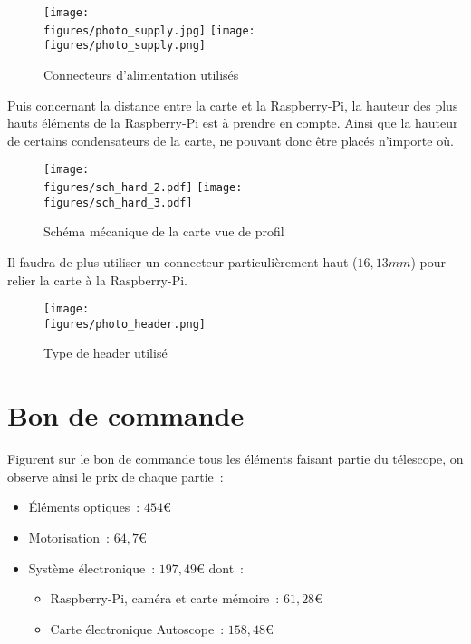 \begin{figure}[H]
    \centering
    \texttt{[image: \\figures/photo\_supply.jpg]}
	\hspace{1cm}
    \texttt{[image: \\figures/photo\_supply.png]}
    \decoRule
    \caption[
    Connecteurs d'alimentation utilisés]{
    Connecteurs d'alimentation utilisés}
    \label{fig:Connecteurs d'alimentation utilisés}
    \end{figure}

\vspace{1cm}

Puis concernant la distance entre la carte et la Raspberry-Pi, la hauteur des plus hauts éléments de la Raspberry-Pi est à prendre en compte. Ainsi que la hauteur de certains condensateurs de la carte, ne pouvant donc être placés n'importe où.

\begin{figure}[H]
    \centering
    \texttt{[image: \\figures/sch\_hard\_2.pdf]}
    \texttt{[image: \\figures/sch\_hard\_3.pdf]}
    \decoRule
    \caption[
    Schéma mécanique de la carte vue de profil]{
    Schéma mécanique de la carte vue de profil}
    \label{fig:Schéma mécanique de la carte vue de profil}
    \end{figure}

\vspace{1cm}

Il faudra de plus utiliser un connecteur particulièrement haut ($16,13mm$) pour relier la carte à la Raspberry-Pi.

\begin{figure}[H]
    \centering
    \texttt{[image: \\figures/photo\_header.png]}
    \decoRule
    \caption[
    Type de header utilisé]{
    Type de header utilisé}
    \label{fig:Type de header utilisé}
    \end{figure}

\newpage
\section{Bon de commande} %

Figurent sur le bon de commande tous les éléments faisant partie du télescope, on observe ainsi le prix de chaque partie~:
\begin{itemize}[label=$\bullet$]
	\item Éléments optiques~: $454$€
	\item Motorisation~: $64,7$€
	\item Système électronique~: $197,49$€ dont~:
	\begin{itemize}
		\item Raspberry-Pi, caméra et carte mémoire~: $61,28$€
		\item Carte électronique Autoscope~: $158,48$€
		\end{itemize}
	\end{itemize}

